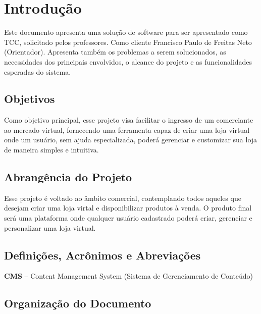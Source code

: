 \documentclass[a4paper,12pt]{monografia}
\begin{document}
\section{Introdução} %
\label{sec:Introducao}

Este documento apresenta uma solução de software para ser apresentado como TCC, solicitado pelos professores. Como cliente Francisco Paulo de Freitas Neto (Orientador). Apresenta também os problemas a serem solucionados, as necessidades dos principais envolvidos, o alcance do projeto e as funcionalidades esperadas do sistema.

\subsection{Objetivos} %
\label{sec:objetivos}

Como objetivo principal, esse projeto visa facilitar o ingresso de um comerciante ao mercado virtual, fornecendo uma ferramenta capaz de criar uma loja virtual onde um usuário, sem ajuda especializada, poderá gerenciar e customizar sua loja de maneira simples e intuitiva.


\subsection{Abrangência do Projeto} %
\label{sec:abrengencia_do_projeto}

Esse projeto é voltado ao âmbito comercial, contemplando todos aqueles que desejam criar uma loja virtal e disponibilizar produtos à venda.
O produto final será uma plataforma onde qualquer usuário cadastrado poderá criar, gerenciar e personalizar uma loja virtual.


\subsection{Definições, Acrônimos e Abreviações} %
\label{sec:siglas}

\textbf{CMS} – Content Management System (Sistema de Gerenciamento de Conteúdo)

\subsection{Organização do Documento} %
\label{sec:organizacao_do_documento}
\end{document}
